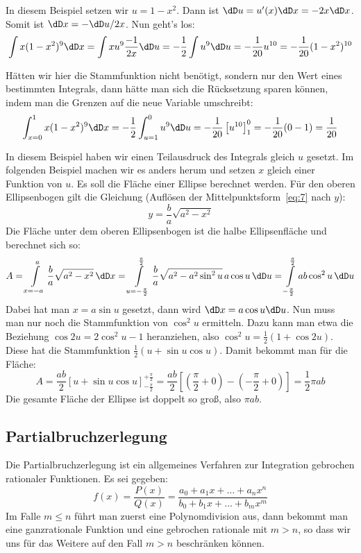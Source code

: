 In diesem Beispiel setzen wir $u=1-x^2$. Dann ist $\dD u=u'(x)\dD x=-2x\dD x$.
Somit ist $\dD x=-\dD u/2x$. Nun geht's los:
\[
\int x(1-x^2)^9\dD x=\int x u^9 \frac{-1}{2x}\dD u
=-\frac{1}{2}\int u^9\dD u=-\frac{1}{20}u^{10}=-\frac{1}{20}(1-x^2)^{10}
\]

Hätten wir hier die Stammfunktion nicht benötigt, sondern nur den Wert eines
bestimmten Integrals, dann hätte man sich die Rücksetzung sparen können, indem
man die Grenzen auf die neue Variable umschreibt:
\[
\int_{x=0}^1 x(1-x^2)^9\dD x=-\frac{1}{2}\int_{u=1}^0u^9\dD u
=-\frac{1}{20}\left[u^{10}\right]_1^0=-\frac{1}{20}(0-1)=\frac{1}{20}
\]

In diesem Beispiel haben wir einen Teilausdruck des Integrals gleich $u$
gesetzt. Im folgenden Beispiel machen wir es anders herum und setzen $x$
gleich einer Funktion von $u$. Es soll die Fläche einer Ellipse berechnet
werden. Für den oberen Ellipsenbogen gilt die Gleichung (Auflösen der
Mittelpunktsform~\eqref{eq:7} nach $y$):
\[
y=\frac{b}{a}\sqrt{a^2-x^2}
\]
Die Fläche unter dem oberen Ellipsenbogen ist die halbe Ellipsenfläche und
berechnet sich so:
\[
A=\int\limits_{x=-a}^a \frac{b}{a}\sqrt{a^2-x^2}\,\dD x=
\int\limits_{u=-\frac{\pi}{2}}^{\frac{\pi}{2}}
\frac{b}{a}\sqrt{a^2-a^2\sin^2u}\,a\cos u\,\dD u=
\int\limits_{-\frac{\pi}{2}}^{\frac{\pi}{2}}ab\cos^2u\,\dD u
\]
Dabei hat man $x=a\sin u$ gesetzt, dann wird $\dD x=a\cos u \dD u$. Nun muss
man nur noch die Stammfunktion von $\cos^2u$ ermitteln. Dazu kann man etwa die
Beziehung $\cos2u=2\cos^2u-1$ heranziehen, also
$\cos^2u=\frac{1}{2}(1+\cos2u)$. Diese hat die Stammfunktion
$\frac{1}{2}(u+\sin u\cos u)$. Damit bekommt man für die Fläche:
\[
A=\frac{ab}{2}\left[u+\sin u\cos u\right]_{-\frac{\pi}{2}}^{+\frac{\pi}{2}}=
\frac{ab}{2}[(\frac{\pi}{2}+0)-(-\frac{\pi}{2}+0)]=\frac{1}{2}\pi a b
\]
Die gesamte Fläche der Ellipse ist doppelt so groß, also $\pi a b$.

\subsection{Partialbruchzerlegung}
Die Partialbruchzerlegung ist ein allgemeines Verfahren zur Integration
gebrochen rationaler Funktionen. Es sei gegeben:
\begin{equation}
  \label{eq:68}
  f(x)=\frac{P(x)}{Q(x)}
  =\frac{a_0+a_1x+\dots+a_nx^n}{b_0+b_1x+\dots+b_mx^m}
\end{equation}
Im Falle $m\le n$ führt man zuerst eine Polynomdivision aus, dann bekommt man
eine ganzrationale Funktion und eine gebrochen rationale mit $m>n$, so dass
wir uns für das Weitere auf den Fall $m>n$ beschränken können.

